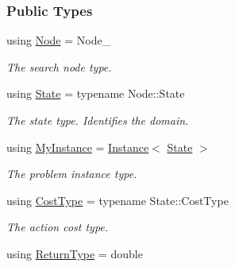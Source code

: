\subsubsection*{Public Types}
\begin{DoxyCompactItemize}
\item 
using \hyperlink{structPerGoal_adbe07e3686a96a917c9008264df2b3cd}{Node} = Node\+\_\+\hypertarget{structPerGoal_adbe07e3686a96a917c9008264df2b3cd}{}\label{structPerGoal_adbe07e3686a96a917c9008264df2b3cd}

\begin{DoxyCompactList}\small\item\em The search node type. \end{DoxyCompactList}\item 
using \hyperlink{structPerGoal_a8357a5c06c75224cc33f8c9be3d6b122}{State} = typename Node\+::\+State\hypertarget{structPerGoal_a8357a5c06c75224cc33f8c9be3d6b122}{}\label{structPerGoal_a8357a5c06c75224cc33f8c9be3d6b122}

\begin{DoxyCompactList}\small\item\em The state type. Identifies the domain. \end{DoxyCompactList}\item 
using \hyperlink{structPerGoal_a202c6aec2e84dd9f8cf531ddd385cc78}{My\+Instance} = \hyperlink{structInstance}{Instance}$<$ \hyperlink{structPerGoal_a8357a5c06c75224cc33f8c9be3d6b122}{State} $>$\hypertarget{structPerGoal_a202c6aec2e84dd9f8cf531ddd385cc78}{}\label{structPerGoal_a202c6aec2e84dd9f8cf531ddd385cc78}

\begin{DoxyCompactList}\small\item\em The problem instance type. \end{DoxyCompactList}\item 
using \hyperlink{structPerGoal_aacb961f844f20c9a842001575a67bd3f}{Cost\+Type} = typename State\+::\+Cost\+Type\hypertarget{structPerGoal_aacb961f844f20c9a842001575a67bd3f}{}\label{structPerGoal_aacb961f844f20c9a842001575a67bd3f}

\begin{DoxyCompactList}\small\item\em The action cost type. \end{DoxyCompactList}\item 
using \hyperlink{structPerGoal_a08b8b1a8d7b60e4c553ff81b37b1b2ac}{Return\+Type} = double\hypertarget{structPerGoal_a08b8b1a8d7b60e4c553ff81b37b1b2ac}{}\label{structPerGoal_a08b8b1a8d7b60e4c553ff81b37b1b2ac}


\end{DoxyCompactItemize}
